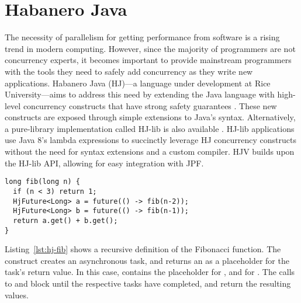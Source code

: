 \section{Habanero Java}
\begin{comment}
\noindent\textbf{Nick} will write this section.

Tight overview of Habanero Java. Motivate the importance of the
language rather than try to introduce all of the language
features. Emphasize the guarantees on correctness in the absence of
data race. Contain to one-page plus figures.
\end{comment}

The necessity of parallelism for getting performance from software
is a rising trend in modern computing.
However, since the majority of programmers are not concurrency experts,
it becomes important to provide mainstream programmers with the tools
they need to safely add concurrency as they write new applications.
Habanero Java (HJ)---a language under development at Rice University---aims
to address this need by extending the Java language with high-level concurrency
constructs that have strong safety guarantees \cite{hj-overview}.
These new constructs are exposed through simple extensions to Java's syntax.
Alternatively, a pure-library implementation called HJ-lib is also available \cite{hj-lib}.
HJ-lib applications use Java 8's lambda expressions to succinctly leverage HJ concurrency constructs without the need for syntax extensions and a custom compiler.
HJV builds upon the HJ-lib API, allowing for easy integration with JPF.
\begin{lstlisting}
long fib(long n) {
  if (n < 3) return 1;
  HjFuture<Long> a = future(() -> fib(n-2));
  HjFuture<Long> b = future(() -> fib(n-1));
  return a.get() + b.get();
}
\end{lstlisting}


Listing~\ref{lst:hj-fib} shows a recursive definition of the Fibonacci function.
The  construct creates an asynchronous task, and returns an
 as a placeholder for the task's return value.
In this case,  contains the placeholder for ,
and  for .
The calls to  and  block until the respective
tasks have completed, and return the resulting values.

